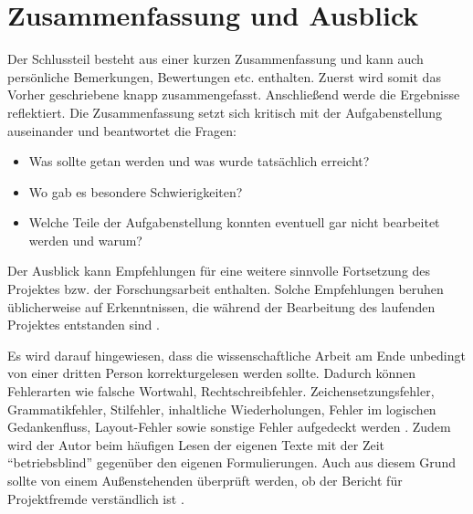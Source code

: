 \chapter{Zusammenfassung und Ausblick}
Der Schlussteil besteht aus einer kurzen Zusammenfassung und kann auch persönliche Bemerkungen, Bewertungen etc. enthalten. Zuerst wird somit das Vorher geschriebene knapp zusammengefasst. Anschließend werde die Ergebnisse reflektiert. Die Zusammenfassung setzt sich kritisch mit der Aufgabenstellung auseinander und beantwortet die Fragen:
\begin{itemize}
	\item Was sollte getan werden und was wurde tatsächlich erreicht?
	\item Wo gab es besondere Schwierigkeiten?
	\item Welche Teile der Aufgabenstellung konnten eventuell gar nicht bearbeitet werden und warum?
\end{itemize}

Der Ausblick kann Empfehlungen für eine weitere sinnvolle Fortsetzung des Projektes bzw. der Forschungsarbeit enthalten.
Solche Empfehlungen beruhen üblicherweise auf Erkenntnissen, die während der Bearbeitung des laufenden Projektes entstanden sind \cite[S.~44]{Hering2009}.

Es wird darauf hingewiesen, dass die wissenschaftliche Arbeit am Ende unbedingt von einer dritten Person korrekturgelesen werden sollte.
Dadurch können Fehlerarten wie falsche Wortwahl, Rechtschreibfehler. Zeichensetzungsfehler, Grammatikfehler, Stilfehler, inhaltliche Wiederholungen, Fehler im logischen Gedankenfluss, Layout-Fehler sowie sonstige Fehler aufgedeckt werden \cite[S.~174]{Hering2009}.
Zudem wird der Autor beim häufigen Lesen der eigenen Texte mit der Zeit "`betriebsblind"' gegenüber den eigenen Formulierungen.
Auch aus diesem Grund sollte von einem Außenstehenden überprüft werden, ob der Bericht für Projektfremde verständlich ist \cite[S.~130]{Hering2009}.